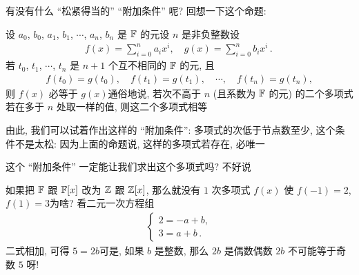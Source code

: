 有没有什么 ``松紧得当的'' ``附加条件'' 呢? 回想一下这个命题:

\begin{proposition}
    设 $a_0$, $b_0$, $a_1$, $b_1$, $\cdots$, $a_n$, $b_n$ 是 $\mathbb{F}$ 的元\period 设 $n$ 是非负整数\period 设
    \begin{align*}
        f(x) = \sum_{i = 0}^n a_i x^i, \quad g(x) = \sum_{i = 0}^n b_i x^i \period
    \end{align*}
    若 $t_0$, $t_1$, $\cdots$, $t_n$ 是 $n+1$ 个互不相同的 $\mathbb{F}$ 的元, 且
    \begin{align*}
        f(t_0) = g(t_0), \quad f(t_1) = g(t_1), \quad \cdots, \quad f(t_n) = g(t_n),
    \end{align*}
    则 $f(x)$ 必等于 $g(x)$\period 通俗地说, 若次不高于 $n$ (且系数为 $\mathbb{F}$ 的元) 的二个多项式若在多于 $n$ 处取一样的值, 则这二个多项式相等\period
\end{proposition}

由此, 我们可以试着作出这样的 ``附加条件'': 多项式的次低于节点数\period 至少, 这个条件不是太松: 因为上面的命题说, 这样的多项式若存在, 必唯一\period

这个 ``附加条件'' 一定能让我们求出这个多项式吗? 不好说\period

\begin{example}
    如果把 $\mathbb{F}$ 跟 $\mathbb{F}[x]$ 改为 $\mathbb{Z}$ 跟 $\mathbb{Z}[x]$, 那么就没有 $1$ 次多项式 $f(x)$ 使 $f(-1)=2$, $f(1)=3$\period 为啥? 看二元一次方程组
    \begin{align*}
        \begin{cases}
            2 = -a + b, \\
            3 = a + b \period
        \end{cases}
    \end{align*}
    二式相加, 可得 $5 = 2b$\period 可是, 如果 $b$ 是整数, 那么 $2b$ 是偶数\period 偶数 $2b$ 不可能等于奇数 $5$ 呀!
\end{example}

